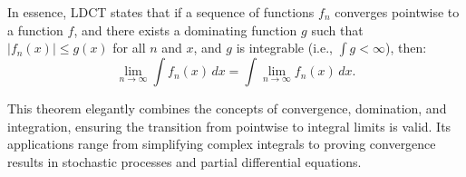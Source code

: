 \documentclass[12pt]{article}
\begin{document}
In essence, LDCT states that if a sequence of functions \(f_n\) converges pointwise to a function \(f\), and there exists a dominating function \(g\) such that \(|f_n(x)| \leq g(x)\) for all \(n\) and \(x\), and \(g\) is integrable (i.e., \(\int g < \infty\)), then:
\[
\lim_{n \to \infty} \int f_n(x) \, dx = \int \lim_{n \to \infty} f_n(x) \, dx.
\]

This theorem elegantly combines the concepts of convergence, domination, and integration, ensuring the transition from pointwise to integral limits is valid. Its applications range from simplifying complex integrals to proving convergence results in stochastic processes and partial differential equations.
\end{document}
